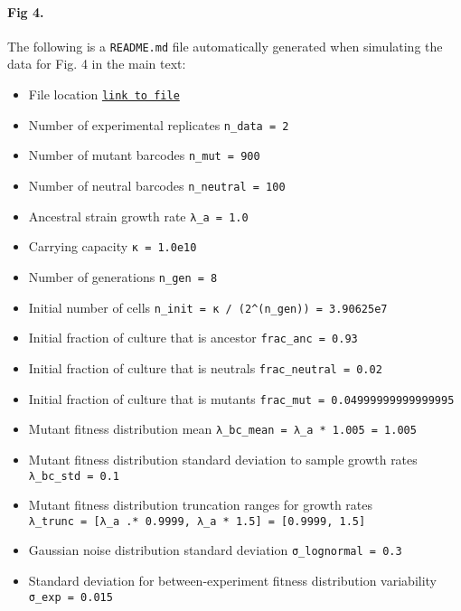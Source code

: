 \documentclass[
]{scrartcl}
\let\oldparagraph\paragraph
\renewcommand{\paragraph}[1]{\oldparagraph{#1}\mbox{}}
\providecommand{\tightlist}{%
  \setlength{\itemsep}{0pt}\setlength{\parskip}{0pt}}\usepackage{longtable,booktabs,array}
\begin{document}
\begin{refsegment}
\hypertarget{fig-4.}{%
\paragraph{Fig 4.}\label{fig-4.}}

The following is a \texttt{README.md} file automatically generated when
simulating the data for Fig. 4 in the main text:

\begin{itemize}
\tightlist
\item
  File location
  \href{https://github.com/mrazomej/bayesian_fitness/blob/master/code/processing/data002_logistic_1000bc_01env_02rep/sim_hierarchical_data002.jl}{\texttt{link\ to\ file}}
\item
  Number of experimental replicates \texttt{n\_data\ =\ 2}
\item
  Number of mutant barcodes \texttt{n\_mut\ =\ 900}
\item
  Number of neutral barcodes \texttt{n\_neutral\ =\ 100}
\item
  Ancestral strain growth rate \texttt{λ\_a\ =\ 1.0}
\item
  Carrying capacity \texttt{κ\ =\ 1.0e10}
\item
  Number of generations \texttt{n\_gen\ =\ 8}
\item
  Initial number of cells
  \texttt{n\_init\ =\ κ\ /\ (2\^{}(n\_gen))\ =\ 3.90625e7}
\item
  Initial fraction of culture that is ancestor
  \texttt{frac\_anc\ =\ 0.93}
\item
  Initial fraction of culture that is neutrals
  \texttt{frac\_neutral\ =\ 0.02}
\item
  Initial fraction of culture that is mutants
  \texttt{frac\_mut\ =\ 0.04999999999999995}
\item
  Mutant fitness distribution mean
  \texttt{λ\_bc\_mean\ =\ λ\_a\ *\ 1.005\ =\ 1.005}
\item
  Mutant fitness distribution standard deviation to sample growth rates
  \texttt{λ\_bc\_std\ =\ 0.1}
\item
  Mutant fitness distribution truncation ranges for growth rates
  \texttt{λ\_trunc\ =\ {[}λ\_a\ .*\ 0.9999,\ λ\_a\ *\ 1.5{]}\ =\ {[}0.9999,\ 1.5{]}}
\item
  Gaussian noise distribution standard deviation
  \texttt{σ\_lognormal\ =\ 0.3}
\item
  Standard deviation for between-experiment fitness distribution
  variability \texttt{σ\_exp\ =\ 0.015}
\end{itemize}


\end{refsegment}
\end{document}
